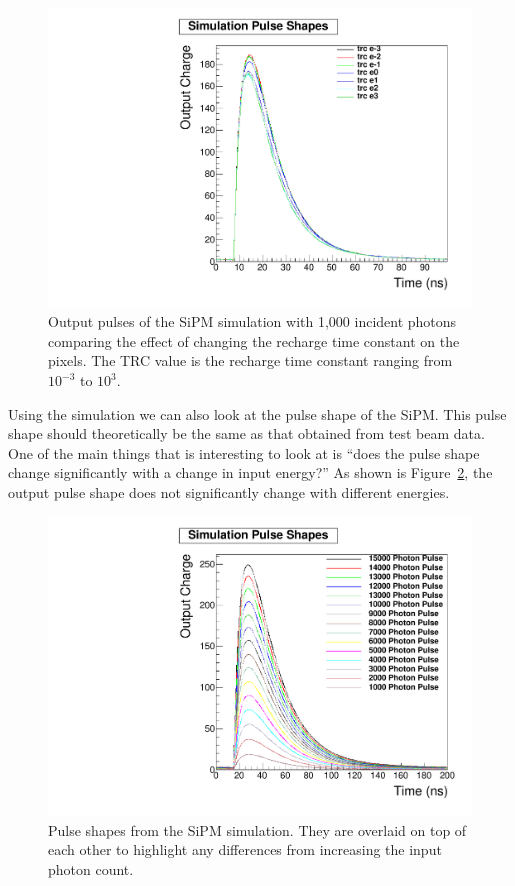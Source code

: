 \begin{figure}
\centering
\includegraphics[width=0.8\linewidth]{Figures/trc.pdf}
\caption{Output pulses of the SiPM simulation with 1,000 incident photons comparing the effect of changing the recharge time constant on the pixels. The TRC value is the recharge time constant ranging from $10^{-3}$ to $10^3$.}
\label{fig:trc}
\end{figure}

Using the simulation we can also look at the pulse shape of the SiPM. This pulse shape should theoretically be the same as that obtained from test beam data. One of the main things that is interesting to look at is ``does the pulse shape change significantly with a change in input energy?'' As shown is Figure~\ref{fig:SimPul}, the output pulse shape does not significantly change with different energies.

\begin{figure}
\centering
\includegraphics[width=0.8\linewidth]{Figures/SimPul.pdf}
\caption{Pulse shapes from the SiPM simulation. They are overlaid on top of each other to highlight any differences from increasing the input photon count.}
\label{fig:SimPul}
\end{figure}

